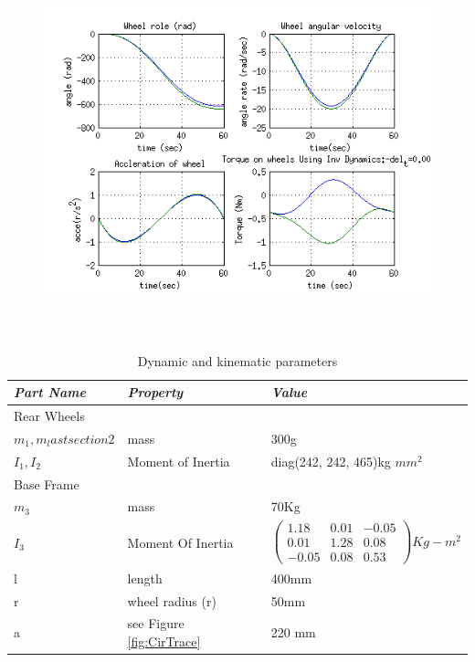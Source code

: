{ \begin{figure}
	\includegraphics[height=300pt,keepaspectratio]{Chapter4/fig/FD}
	\label{fig:spiral} 
\end{figure} 
%
\begin{table}[!htbp]
	\caption{Dynamic and kinematic parameters }
	\label{tb:massproperty}
	\centering
	\begin{tabular}{l l l}
		\hline
		\emph{Part Name}  & \emph{ Property} & \emph{Value} \\
		\hline
		Rear Wheels & & \\
		 $m_1,m_last section2$	& mass				&300g \\ 
		  $I_1,I_2$	& Moment of Inertia	& diag(242, 242, 465)kg $mm^2$\\
		Base Frame& & \\
		 $m_3$ & mass  & 70Kg \\
		 $ I_3$& Moment Of Inertia & $ \begin{pmatrix}
		 1.18& 0.01&-0.05\\ 0.01 & 1.28 & 0.08\\
		 -0.05 & 0.08 & 0.53
		 \end{pmatrix} Kg-m^2$ \\
		   l & length & 400mm\\
		  r & wheel radius (r) & 50mm\\
		 a & see Figure \ref{fig:CirTrace} & 220 mm \\ 
		\hline
		\end{tabular}
\end{table}



}
